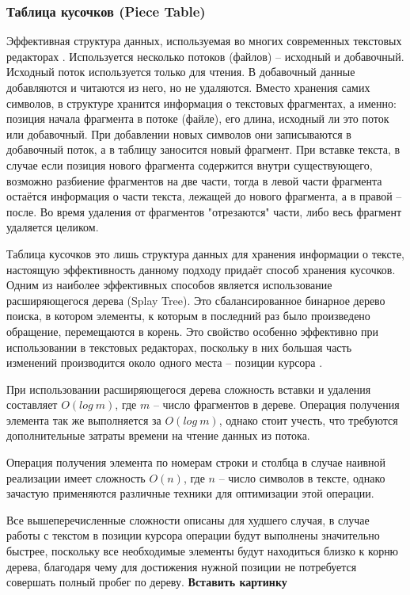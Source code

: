 \documentclass{fefu}
\begin{document}
			\subsubsection{Таблица кусочков (Piece Table)}
				\par Эффективная структура данных, используемая во многих современных 
				текстовых редакторах \cite{PieceTableArticle}. Используется несколько потоков
				(файлов) -- исходный и добавочный. Исходный поток используется только для 
				чтения. В добавочный данные добавляются и читаются из него, но не удаляются.
				Вместо хранения самих символов, в структуре хранится информация о текстовых 
				фрагментах, а именно: позиция начала фрагмента в потоке (файле), его длина, 
				исходный ли это поток или добавочный. При добавлении новых символов они
				записываются в добавочный поток, а в таблицу заносится новый фрагмент. При
				вставке текста, в случае если позиция нового фрагмента содержится внутри
				существующего, возможно разбиение фрагментов на две части, тогда в левой части
				фрагмента остаётся информация о части текста, лежащей до нового фрагмента, а в 
				правой -- после. Во время удаления от фрагментов "отрезаются" части, либо весь
				фрагмент удаляется целиком.
				\par Таблица кусочков это лишь структура данных для хранения информации о
				тексте, настоящую эффективность данному подходу придаёт способ хранения
				кусочков. Одним из наиболее эффективных способов является использование 
				расширяющегося дерева (Splay Tree). Это сбалансированное бинарное дерево 
				поиска, в котором элементы, к которым в последний раз было произведено
				обращение, перемещаются в корень. Это свойство особенно эффективно при
				использовании в текстовых редакторах, поскольку в них большая часть изменений
				производится около одного места -- позиции курсора \cite{SplayTreeArticle}.
				\par При использовании расширяющегося дерева сложность вставки и удаления
				составляет $O(log~m)$, где $m$ -- число фрагментов в дереве. Операция получения
				элемента так же выполняется за $O(log~m)$, однако стоит учесть, что
				требуются дополнительные затраты времени на чтение данных из потока.
				\par Операция получения элемента по номерам строки и столбца в случае наивной
				реализации имеет сложность $O(n)$, где $n$ -- число символов в тексте, однако
				зачастую применяются различные техники для оптимизации этой операции.
				\par Все вышеперечисленные сложности описаны для худшего случая, в случае
				работы с текстом в позиции курсора операции будут выполнены значительно 
				быстрее, поскольку все необходимые элементы будут находиться близко к корню
				дерева, благодаря чему для достижения нужной позиции не потребуется совершать
				полный пробег по дереву.
				\textbf{Вставить картинку}
\end{document}
